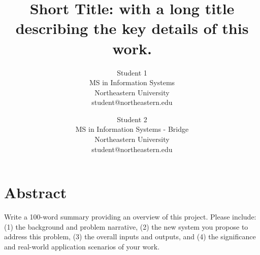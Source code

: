 \documentclass[final]{cvpr}
\begin{document}
\title{Short Title: with a long title describing the key details of this work.}

\author{Student 1\\
MS in Information Systems\\
Northeastern University\\
student@northeastern.edu
\and{Student 2}\\
MS in Information Systems - Bridge\\
Northeastern University\\
student@northeastern.edu
}

{}


\section{Abstract}
Write a 100-word summary providing an overview of this project. Please include: (1) the background and problem narrative, (2) the new system you propose to address this problem, (3) the overall inputs and outputs, and (4) the significance and real-world application scenarios of your work.

\end{document}
